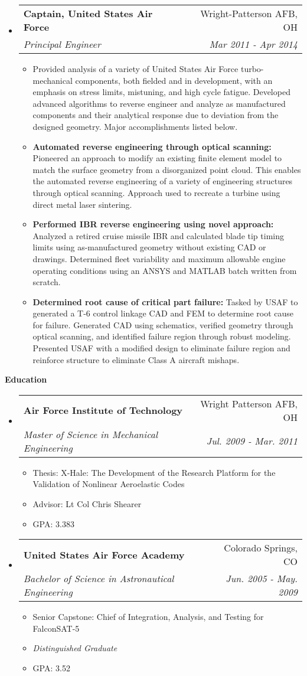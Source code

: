 \documentclass[letterpaper,11pt]{article}
\makeatletter
\newcommand{\resitem}[1]{\item #1 \vspace{-2pt}}
\newcommand{\resheading}[1]{{\large \colorbox{mygrey}{\begin{minipage}{\textwidth}{\textbf{#1 \vphantom{p\^{E}}}}\end{minipage}}}}
\newcommand{\ressubheading}[4]{
\begin{tabular*}{7.0in}{l@{\extracolsep{\fill}}r}
		\textbf{#1} & #2 \\
		\textit{#3} & \textit{#4} \\
\end{tabular*}\vspace{-6pt}}
\makeatother
\begin{document}
\begin{itemize}
\item
  \ressubheading{Captain, United States Air Force}{Wright-Patterson AFB, OH}{Principal Engineer}{Mar 2011 - Apr 2014}
  \begin{itemize}
    \resitem{Provided analysis of a variety of United States Air Force turbo-mechanical components, both fielded and in development, with an emphasis on stress limits, mistuning, and high cycle fatigue.  Developed advanced algorithms to reverse engineer and analyze as manufactured components and their analytical response due to deviation from the designed geometry.  Major accomplishments listed below.}
    \resitem{\textbf{Automated reverse engineering through optical scanning:}  Pioneered an approach to modify an existing finite element model to match the surface geometry from a disorganized point cloud.  This enables the automated reverse engineering	of a variety of engineering structures through optical scanning.  Approach used to recreate a turbine using direct metal laser sintering.}
    \resitem{\textbf{Performed IBR reverse engineering using novel approach:}  Analyzed a retired cruise missile IBR and calculated blade tip timing limits using as-manufactured geometry without existing CAD or drawings.  Determined fleet variability and maximum allowable engine operating conditions using an ANSYS and MATLAB batch written from scratch.}
    \resitem{\textbf{Determined root cause of critical part failure:}  Tasked by USAF to generated a T-6 control linkage CAD and FEM to determine root cause for failure.  Generated CAD using schematics, verified geometry through optical scanning, and identified failure region through robust modeling.  Presented USAF with a modified design to eliminate failure region and reinforce structure to eliminate Class A aircraft mishaps.}
  \end{itemize}

\end{itemize}


\resheading{Education}
\begin{itemize}
\item
  \ressubheading{Air Force Institute of Technology}{Wright Patterson AFB, OH}{Master of Science in Mechanical Engineering}{Jul. 2009 - Mar. 2011}
  \begin{itemize}
    \resitem{Thesis: X-Hale: The Development of the Research Platform for the Validation of Nonlinear Aeroelastic Codes}
    \resitem{Advisor: Lt Col Chris Shearer}
    \resitem{GPA: 3.383}
  \end{itemize}

\item
  \ressubheading{United States Air Force Academy}{Colorado Springs, CO}{Bachelor of Science in Astronautical Engineering}{Jun. 2005 - May. 2009}
  \begin{itemize}
    \resitem{Senior Capstone: Chief of Integration, Analysis, and Testing for FalconSAT-5}
    \resitem{\emph{Distinguished Graduate}}
    \resitem{GPA: 3.52}
  \end{itemize}

\end{itemize}
\end{document}
